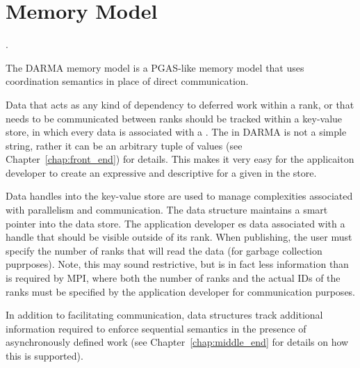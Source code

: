 \section{Memory Model}
\label{sec:mem_model}

.



The DARMA memory model is a \gls{PGAS}-like memory model that uses
\gls{coordination semantics} in place of direct communication.


Data that acts as any kind of dependency to deferred work within a rank, or
that needs to be communicated between ranks should be tracked within a
\gls{key-value store}, in which every data  is associated
with a .
The  in DARMA is not a simple
string, rather it can be an arbitrary \gls{tuple} of values (see Chapter~\ref{chap:front_end}) for details.
This makes it very easy for the applicaiton developer to create an expressive
and descriptive  for a given  in the store.


Data \glspl{handle} into the \gls{key-value store} are used to manage
complexities associated with parallelism and communication.  
The  data structure maintains a smart pointer into the data
store.  The application developer es data associated with a
handle that should be visible
outside of its \gls{rank}.  When publishing,  the user must specify the
number of \glspl{rank} that will read the data (for garbage
    collection puprposes).  Note, this may sound restrictive, but is in fact
less information than is required by \gls{MPI}, where both the number of ranks
and the actual IDs of the ranks must be specified by the application developer
for communication purposes.

In addition to facilitating communication,  data structures track additional information required 
to enforce \gls{sequential semantics} in the presence of asynchronously defined
work (see Chapter~\ref{chap:middle_end} for details on how this is supported).


